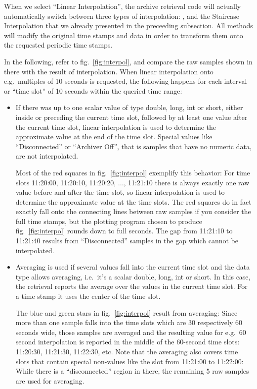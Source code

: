 \noindent When we select ``Linear Interpolation'', the archive retrieval code
will actually automatically switch between three types of
interpolation: ,  and the
Staircase Interpolation that we already presented in the preceeding
subsection. All methods will modify the original time stamps and data
in order to transform them onto the requested periodic time stamps.  

In the following, refer to fig.~\ref{fig:interpol}, and compare the
raw samples shown in there with the result of interpolation.  When
linear interpolation onto e.g.\ multiples of 10 seconds is requested,
the following happens for each interval or ``time slot'' of 10 seconds
within the queried time range:
\begin{itemize}
\item If there was up to one scalar value of type double,
  long, int or short, either inside or preceding the current time
  slot, followed by at least one value after the current time slot,
  linear interpolation is used to determine the approximate value at
  the end of the time slot. Special values like ``Disconnected'' or
  ``Archiver Off'', that is samples that have no numeric data, are not
  interpolated.

  Most of the red squares in fig.~\ref{fig:interpol} exemplify this
  behavior: For time slots 11:20:00, 11:20:10, 11:20:20, ..., 11:21:10
  there is always exactly one raw value before and after the time
  slot, so linear interpolation is used to determine the approximate
  value at the time slots.
  The red squares do in fact exactly fall onto the connecting lines
  between raw samples if you consider the full time stamps, but the
  plotting program chosen to produce fig.~\ref{fig:interpol} rounds
  down to full seconds.
  The gap from 11:21:10 to 11:21:40 results from ``Disconnected''
  samples in the gap which cannot be interpolated.

\item Averaging is used if several values fall into the
  current time slot and the data type allows averaging,
  i.e.\ it's a scalar double, long, int or short.
  In this case, the retrieval reports the average over
  the values in the current time slot. For a time stamp
  it uses the center of the time slot.

  The blue and green stars in fig.~\ref{fig:interpol} result from
  averaging: Since more than one sample falls into the time slots
  which are 30 respectively 60 seconds wide, those samples are
  averaged and the resulting value for e.g.\ 60 second interpolation
  is reported in the middle of the 60-second time slots: 11:20:30, 11:21:30,
  11:22:30, etc. Note that the averaging also covers time slots that
  contain special non-values like the slot from 11:21:00 to 11:22:00:
  While there is a ``disconnected'' region in there, the remaining 5
  raw samples are used for averaging.


\end{itemize}
